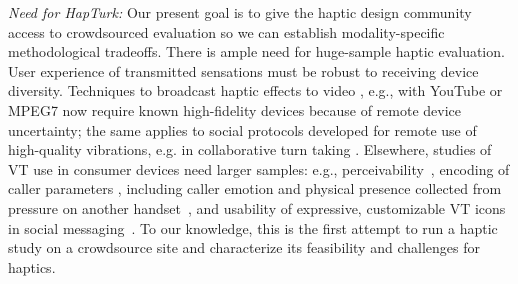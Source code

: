 {\it Need for HapTurk:} Our present goal is to give the haptic design community access to crowdsourced evaluation so we can establish modality-specific methodological tradeoffs.
%
There is ample need for huge-sample haptic evaluation. User experience of transmitted sensations must be robust to receiving device diversity.
Techniques to broadcast haptic effects to video \cite{Modhrain2001,Kim2009}, e.g., with YouTube \cite{AbdurRahman2010} or MPEG7 \cite{Eid2006,Ferre2008} now require known high-fidelity devices  because of remote device uncertainty;  
the same applies to social protocols developed for remote use of high-quality vibrations, e.g. in collaborative turn taking \cite{Chan2008}. 
Elsewhere, studies of VT use in consumer devices need larger samples: e.g., 
perceivability~\cite{Kaaresoja2005}, encoding of caller parameters \cite{Brown2006b}, including caller
emotion and physical presence collected from pressure on another handset~\cite{Hoggan2012}, and usability of expressive, customizable VT icons in social messaging~\cite{Israr2015}.
%
To our knowledge, this is the first attempt to run a haptic study on a crowdsource site and characterize its feasibility and challenges for haptics. 
			
    
    

